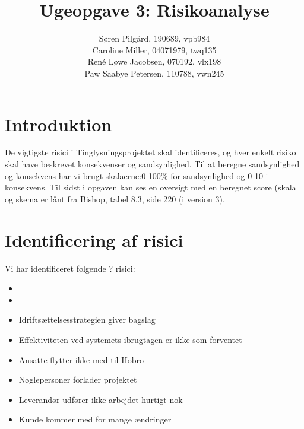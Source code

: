 \documentclass[10pt,a4paper,danish]{article}
\title{Ugeopgave 3: Risikoanalyse}
\author{Søren Pilgård, 190689, vpb984\\
Caroline Miller, 04071979, twq135\\
René Løwe Jacobsen, 070192, vlx198\\
Paw Saabye Petersen, 110788, vwn245}
\begin{document}
\maketitle
\newpage


\section{Introduktion}
De vigtigste risici i Tinglysningsprojektet skal identificeres, og hver enkelt risiko skal have beskrevet konsekvenser og sandsynlighed. Til at beregne sandsynlighed og konsekvens har vi brugt skalaerne:0-100\% for sandsynlighed og 0-10 i konsekvens. Til sidst i opgaven kan ses en oversigt med en beregnet score (skala og skema er lånt fra Bishop, tabel 8.3, side 220 (i version 3).

\section{Identificering af risici}
Vi har identificeret følgende ? risici:
\begin{itemize}
\item 
\item 
\item Idriftsættelsesstrategien giver bagslag
\item Effektiviteten ved systemets ibrugtagen er ikke som forventet
\item Ansatte flytter ikke med til Hobro 
\item Nøglepersoner forlader projektet
\item Leverandør udfører ikke arbejdet hurtigt nok
\item Kunde kommer med for mange ændringer
\end{itemize}
\end{document}
